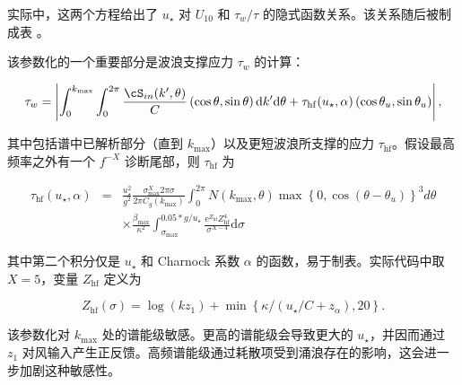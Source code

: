 \noindent
实际中，这两个方程给出了 $u_\star$ 对 $U_{10}$ 和 $\tau_w/\tau$ 的隐式函数关系。该关系随后被制成表 \citep{art:Jan91, rep:Bea07}。

该参数化的一个重要部分是波浪支撑应力 $\tau_w$ 的计算：

\begin{equation}
\tau_w=\left|\int_0^{k_{\max}} \int_0^{2 \pi} \frac{\cS_{in}(k',\theta)}{C}
\left(\cos \theta, \sin \theta \right)  {\mathrm d} k' \mathrm d \theta +
\tau_{\mathrm{hf}}(u_\star,\alpha) \left(\cos \theta_u, \sin \theta_u \right)
\right|,\label{eq:tauwint}
\end{equation}

\noindent
其中包括谱中已解析部分（直到 $k_{\max}$）以及更短波浪所支撑的应力 $\tau_{\mathrm{hf}}$。假设最高频率之外有一个 $f^{-X}$ 诊断尾部，则 $\tau_{\mathrm{hf}}$ 为

\begin{eqnarray}
\tau_{\mathrm{hf}}(u_\star,\alpha)&= &\frac{u_{\star}^2}{g^2}
\frac{\sigma_{\max}^X 2 \pi \sigma }{2 \pi C_g(k_{\max})} \int_0^{2 \pi} N
\left(k_{\max},\theta \right)
\max\left\{0,\cos\left(\theta-\theta_u\right)\right\}^3 d \theta \nonumber \\
& & \times \frac{\beta_{\mathrm{max}}}{\kappa^2}
\int_{\sigma_{\max}}^{0.05*g/u_\star} \frac{{\mathrm
e}^{Z_{\mathrm{hf}}}Z_{\mathrm{hf}}^4}{\sigma^{X-4}} {\mathrm d} \sigma
\label{eq:tauhfint}
\end{eqnarray}

\noindent
其中第二个积分仅是 $u_\star$ 和 Charnock 系数 $\alpha$ 的函数，易于制表。实际代码中取 $X=5$，变量 $Z_{\mathrm{hf}}$ 定义为

\begin{equation}
Z_{\mathrm{hf}}(\sigma)=\log(k z_1)+\min\left\{\kappa/\left(u_\star/C +
z_\alpha \right),20\right\}.
\end{equation}

\noindent
该参数化对 $k_{\max}$ 处的谱能级敏感。更高的谱能级会导致更大的 $u_\star$，并因而通过 $z_1$ 对风输入产生正反馈。高频谱能级通过耗散项受到涌浪存在的影响，这会进一步加剧这种敏感性。

